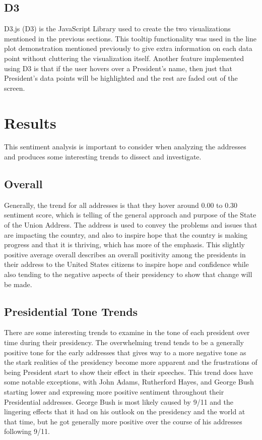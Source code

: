 \subsection{D3}
D3.js (D3) is the JavaScript Library used to create the two visualizations mentioned in the previous sections.
This tooltip functionality was used in the line plot demonstration mentioned previously to give extra information on each data point without cluttering the visualization itself.
Another feature implemented using D3 is that if the user hovers over a President's name, then just that President's data points will be highlighted and the rest are faded out of the screen.

\section{Results}
This sentiment analysis is important to consider when analyzing the addresses and produces some interesting trends to dissect and investigate.

\subsection{Overall}
Generally, the trend for all addresses is that they hover around 0.00 to 0.30 sentiment score, which is telling of the general approach and purpose of the State of the Union Address.
The address is used to convey the problems and issues that are impacting the country, and also to inspire hope that the country is making progress and that it is thriving, which has more of the emphasis.
This slightly positive average overall describes an overall positivity among the presidents in their address to the United States citizens to inspire hope and confidence while also tending to the negative aspects of their presidency to show that change will be made.

\subsection{Presidential Tone Trends}
There are some interesting trends to examine in the tone of each president over time during their presidency.
The overwhelming trend tends to be a generally positive tone for the early addresses that gives way to a more negative tone as the stark realities of the presidency become more apparent and the frustrations of being President start to show their effect in their speeches.
This trend does have some notable exceptions, with John Adams, Rutherford Hayes, and George Bush starting lower and expressing more positive sentiment throughout their Presidential addresses.
George Bush is most likely caused by 9/11 and the lingering effects that it had on his outlook on the presidency and the world at that time, but he got generally more positive over the course of his addresses following 9/11.

